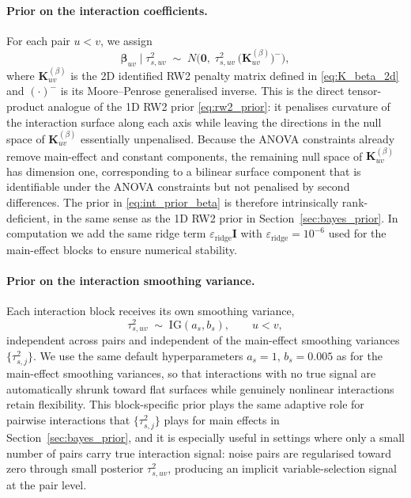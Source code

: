 \paragraph{Prior on the interaction coefficients.}
For each pair $u<v$, we assign
\begin{equation}
\boldsymbol\beta_{uv}\mid\tau^2_{s,uv}
\;\sim\;N\!\Big(\mathbf 0,\;\tau^2_{s,uv}\,\big(\mathbf K_{uv}^{(\beta)}\big)^{-}\Big),
\label{eq:int_prior_beta}
\end{equation}
where $\mathbf K_{uv}^{(\beta)}$ is the 2D identified RW2 penalty matrix defined in
\eqref{eq:K_beta_2d} and $(\cdot)^{-}$ is its Moore--Penrose generalised inverse. This is the
direct tensor-product analogue of the 1D RW2 prior \eqref{eq:rw2_prior}: it penalises
curvature of the interaction surface along each axis while leaving the directions in the
null space of $\mathbf K_{uv}^{(\beta)}$ essentially unpenalised. Because the ANOVA
constraints already remove main-effect and constant components, the remaining null space of
$\mathbf K_{uv}^{(\beta)}$ has dimension one, corresponding to a bilinear surface component
that is identifiable under the ANOVA constraints but not penalised by second differences.
The prior in \eqref{eq:int_prior_beta} is therefore intrinsically rank-deficient, in the same
sense as the 1D RW2 prior in Section~\ref{sec:bayes_prior}. In computation we add the same
ridge term $\varepsilon_{\mathrm{ridge}}\mathbf I$ with $\varepsilon_{\mathrm{ridge}}=10^{-6}$
used for the main-effect blocks to ensure numerical stability.

\paragraph{Prior on the interaction smoothing variance.}
Each interaction block receives its own smoothing variance,
\begin{equation}
\tau^2_{s,uv}\;\sim\;\mathrm{IG}(a_s,b_s),
\qquad u<v,
\label{eq:int_prior_tau2s}
\end{equation}
independent across pairs and independent of the main-effect smoothing variances
$\{\tau^2_{s,j}\}$. We use the same default hyperparameters $a_s=1,\,b_s=0.005$ as for the
main-effect smoothing variances, so that interactions with no true signal are automatically
shrunk toward flat surfaces while genuinely nonlinear interactions retain flexibility. This
block-specific prior plays the same adaptive role for pairwise interactions that
$\{\tau^2_{s,j}\}$ plays for main effects in Section~\ref{sec:bayes_prior}, and it is
especially useful in settings where only a small number of pairs carry true interaction
signal: noise pairs are regularised toward zero through small posterior
$\tau^2_{s,uv}$, producing an implicit variable-selection signal at the pair level.

